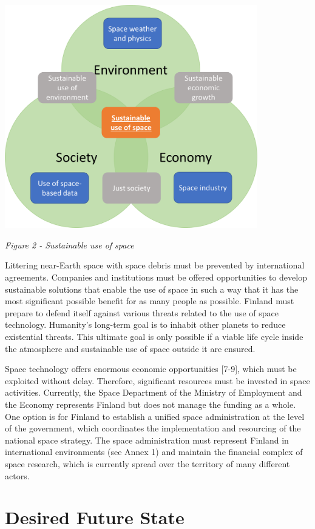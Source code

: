 \documentclass[nobib,finnish,oneside,openany,notoc,a4paper]{tufte-book}
\begin{document}
{\includegraphics[width=11cm]{image2.png}

\emph{Figure 2 - Sustainable use of space}

Littering near-Earth space with space debris must be prevented by
international agreements. Companies and institutions must be offered
opportunities to develop sustainable solutions that enable the use of
space in such a way that it has the most significant possible benefit
for as many people as possible. Finland must prepare to defend itself
against various threats related to the use of space technology.
Humanity's long-term goal is to inhabit other planets to reduce
existential threats. This ultimate goal is only possible if a viable
life cycle inside the atmosphere and sustainable use of space outside it
are ensured.

Space technology offers enormous economic opportunities {[}7-9{]}, which
must be exploited without delay. Therefore, significant resources must
be invested in space activities. Currently, the Space Department of the
Ministry of Employment and the Economy represents Finland but does not
manage the funding as a whole. One option is for Finland to establish a
unified space administration at the level of the government, which
coordinates the implementation and resourcing of the national space
strategy. The space administration must represent Finland in
international environments (see Annex 1) and maintain the financial
complex of space research, which is currently spread over the territory
of many different actors.

\chapter{Desired Future State}

}
\end{document}

